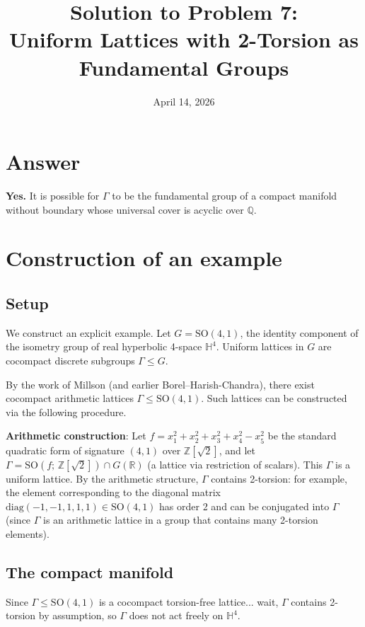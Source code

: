 \documentclass[12pt]{article}
\title{Solution to Problem 7:\\Uniform Lattices with 2-Torsion as Fundamental Groups}
\author{}
\date{April 14, 2026}
\begin{document}
\maketitle

\section*{Answer}

\textbf{Yes.} It is possible for $\Gamma$ to be the fundamental group of a compact manifold without boundary whose universal cover is acyclic over $\mathbb{Q}$.

\section*{Construction of an example}

\subsection*{Setup}

We construct an explicit example.  Let $G = \mathrm{SO}(4,1)$, the identity component of the isometry group of real hyperbolic 4-space $\mathbb{H}^4$.  Uniform lattices in $G$ are cocompact discrete subgroups $\Gamma \leq G$.

By the work of Millson (and earlier Borel--Harish-Chandra), there exist cocompact arithmetic lattices $\Gamma \leq \mathrm{SO}(4,1)$.  Such lattices can be constructed via the following procedure.

\medskip
\noindent\textbf{Arithmetic construction}: Let $f = x_1^2 + x_2^2 + x_3^2 + x_4^2 - x_5^2$ be the standard quadratic form of signature $(4,1)$ over $\mathbb{Z}[\sqrt{2}]$, and let $\Gamma = \mathrm{SO}(f;\,\mathbb{Z}[\sqrt{2}])\cap G(\mathbb{R})$ (a lattice via restriction of scalars).  This $\Gamma$ is a uniform lattice.  By the arithmetic structure, $\Gamma$ contains 2-torsion: for example, the element corresponding to the diagonal matrix $\mathrm{diag}(-1,-1,1,1,1)\in\mathrm{SO}(4,1)$ has order 2 and can be conjugated into $\Gamma$ (since $\Gamma$ is an arithmetic lattice in a group that contains many 2-torsion elements).

\subsection*{The compact manifold}

Since $\Gamma \leq \mathrm{SO}(4,1)$ is a cocompact torsion-free lattice... wait, $\Gamma$ contains 2-torsion by assumption, so $\Gamma$ does not act freely on $\mathbb{H}^4$.
\end{document}
